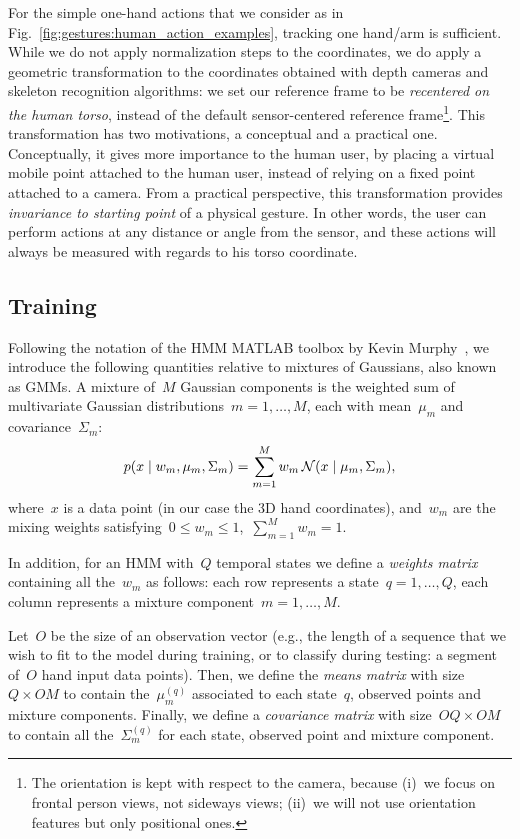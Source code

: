 For the simple one-hand actions that we consider as in Fig.~\ref{fig:gestures:human_action_examples}, tracking one hand/arm is sufficient.
While we do not apply normalization steps to the coordinates, we do apply a geometric transformation to the coordinates obtained with depth cameras and skeleton recognition algorithms: we set our reference frame to be \emph{recentered on the human torso}, instead of the default sensor-centered reference frame\footnote{%
The orientation is kept with respect to the camera, because (i)~we focus on frontal person views, not sideways views; (ii)~we will not use orientation features but only positional ones.%
}.
This transformation has two motivations, a conceptual and a practical one.
Conceptually, it gives more importance to the human user, by placing a virtual mobile point attached to the human user, instead of relying on a fixed point attached to a camera.
From a practical perspective, this transformation provides \emph{invariance to starting point} of a physical gesture. In other words, the user can perform actions at any distance or angle from the sensor, and these actions will always be measured with regards to his torso coordinate.

\subsection{Training}

Following the notation of the \ac{HMM} MATLAB toolbox by Kevin Murphy~\cite{murphy:2012:mlprob}, we introduce the following quantities relative to mixtures of Gaussians, also known as \acp{GMM}. A mixture of~$M$ Gaussian components is the weighted sum of multivariate Gaussian distributions~$m=1,\dots,M$, each with mean~$\mu_m$ and covariance~$\Sigma_m$:
\begin{equation} \label{eq:gmm}
p(x \mid w_m, \mu_m, \Sigma_m) = \sum_{m=1}^M w_m \, \mathcal{N}(x \mid \mu_m, \Sigma_m),
\end{equation}
where~$x$ is a data point (in our case the 3D hand coordinates), and~$w_m$ are the mixing weights satisfying~$0 \leq w_m \leq 1$,~$\sum_{m=1}^M w_m = 1$.

In addition, for an \ac{HMM} with~$Q$ temporal states we define a \emph{weights matrix} containing all the~$w_m$ as follows: each row represents a state~$q = 1, \dots, Q$, each column represents a mixture component~$m = 1, \dots, M$.

Let~$O$ be the size of an observation vector (e.g., the length of a sequence that we wish to fit to the model during training, or to classify during testing: a segment of~$O$ hand input data points).
Then, we define the \emph{means matrix} with size~$Q \times O M$ to contain the~$\mu_m^{(q)}$ associated to each state~$q$, observed points and mixture components.
Finally, we define a \emph{covariance matrix} with size~$O Q \times O M$ to contain all the~$\Sigma_m^{(q)}$ for each state, observed point and mixture component.

